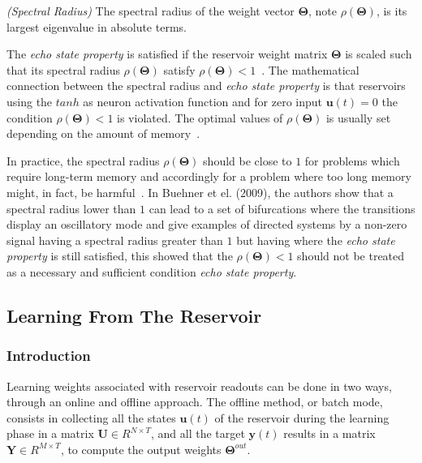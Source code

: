 \documentclass{WitsPhysicsReport}
\begin{document}
\begin{definition}
\emph{(Spectral Radius)}
The spectral radius of the weight vector $\mathbf{\Theta}$, note $\rho (\mathbf{\Theta})$, is its largest eigenvalue in absolute terms.
\label{def: spectra_radius}
\end{definition}

The \textit{echo state property} is satisfied if the reservoir weight matrix  $\mathbf{\Theta}$ is scaled such that its spectral radius $\rho (\mathbf{\Theta})$ satisfy $\rho (\mathbf{\Theta}) < 1$~\cite{jaeger2001echo}. The mathematical connection between the spectral radius and \textit{echo state property} is that reservoirs using the $tanh$  as neuron activation function and for zero input  $\mathbf{u}(t) =0$ the condition $\rho (\mathbf{\Theta}) < 1$  is violated. The optimal values of $\rho (\mathbf{\Theta})$ is usually set depending on the  amount of memory~\cite{lukovsevivcius2009reservoir,jaeger2001echo}. 

In practice, the spectral radius $\rho (\mathbf{\Theta})$ should be close to $1$ for problems which require long-term memory and accordingly for a problem where too long memory might, in fact, be harmful~\cite{lukovsevivcius2009reservoir}. In Buehner et el. (2009), the authors show that a spectral radius lower than $1$ can lead to a set of bifurcations where the transitions display an oscillatory mode and give examples of directed systems by a non-zero signal having a spectral radius greater than $1$ but having  where the \textit{echo state property} is still satisfied, this showed that the $\rho (\mathbf{\Theta}) < 1$ should not be treated as a necessary and sufficient condition \textit{echo state property}.





\subsection{Learning From The Reservoir}
\label{sec:Learning}

\subsubsection{Introduction}
Learning weights associated with reservoir readouts can be done in two ways, through an online and offline approach. The offline method, or batch mode, consists in collecting all the states $\mathbf{u}(t)$ of the reservoir during the learning phase in a matrix $\mathbf{U} \in R^{N \times T}$, and all the target $\mathbf{y}(t)$  results in a matrix $\mathbf{Y} \in R^{M \times T}$, to compute the output weights $\mathbf{\Theta}^{out}$.
\end{document}
